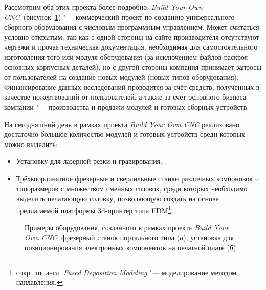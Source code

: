 Рассмотрим оба этих проекта более подробно. \textit{Build Your Own CNC}~(рисунок~\cref{fig:byocnc}) "--- коммерческий проект по созданию универсального сборного оборудования с числовым программным управлением. Может считаться условно открытым, так как с одной стороны на сайте производителя отсутствуют чертежи и прочая техническая документация, необходимая для самостоятельного изготовления того или модуля оборудования (за исключением файлов раскроя основных корпусных деталей), но с другой стороны компания принимает запросы от пользователей на создание новых модулей (новых типов оборудования). Финансирование данных исследований проводится за счёт средств, полученных в качестве пожертвований от пользователей, а также за счет основного бизнеса компании "--- производства и продажи модулей и готовых сборных устройств.

На сегодняшний день в рамках проекта \textit{Build Your Own CNC} реализовано достаточно большое количество модулей и готовых устройств среди которых можно выделить:

\begin{itemize}
	\item Установку для лазерной резки и гравирования.
	
	\item Трёхкоординатное фрезерные и сверлильные станки различных компоновок и типоразмеров с множеством сменных головок, среди которых необходимо выделить печатающую головку, позволяющую создать на основе предлагаемой платформы 3d-принтер типа FDM\footnote{сокр.~от~англ. \textit{Fused Deposition Modeling} "--- моделирование методом наплавления.}.
\end{itemize}

\begin{figure}[ht]
	\caption[Примеры оборудования, созданного в рамках проекта \textit{Build Your Own CNC}]%
		{Примеры оборудования, созданного в рамках проекта \textit{Build Your Own CNC}: фрезерный станок портального типа (\textit{а}), установка для позиционирования электронных компонентов на печатной плате (\textit{б}).}\label{fig:byocnc}
\end{figure}


